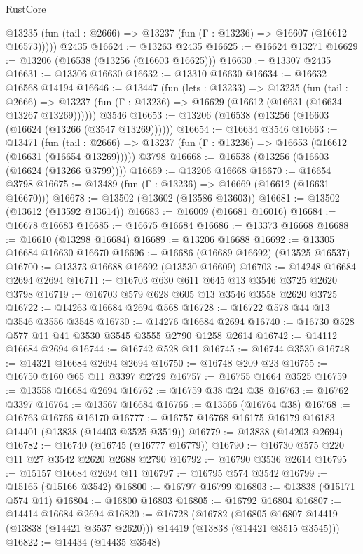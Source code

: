 \begin{lexlean}{RustCore}
\begin{coremodule}
      @13235 (fun (tail : @2666) => @13237 (fun (Γ : @13236) => @16607 (@16612 @16573)))))
    @2435
@16624 := @13263 @2435
@16625 := @16624 @13271
@16629 := @13206 (@16538 (@13256 (@16603 @16625)))
@16630 := @13307 @2435
@16631 := @13306 @16630
@16632 := @13310 @16630
@16634 := @16632 @16568 @14194
@16646 := @13447
    (fun (lets : @13233) =>
    @13235
      (fun (tail : @2666) =>
      @13237 (fun (Γ : @13236) => @16629 (@16612 (@16631 (@16634 @13267 @13269))))))
    @3546
@16653 := @13206 (@16538 (@13256 (@16603 (@16624 (@13266 (@3547 @13269))))))
@16654 := @16634 @3546
@16663 := @13471
    (fun (tail : @2666) => @13237 (fun (Γ : @13236) => @16653 (@16612 (@16631 (@16654 @13269)))))
    @3798
@16668 := @16538 (@13256 (@16603 (@16624 (@13266 @3799))))
@16669 := @13206 @16668
@16670 := @16654 @3798
@16675 := @13489 (fun (Γ : @13236) => @16669 (@16612 (@16631 @16670)))
@16678 := @13502 (@13602 (@13586 @13603))
@16681 := @13502 (@13612 (@13592 @13614))
@16683 := @16009 (@16681 @16016)
@16684 := @16678 @16683
@16685 := @16675 @16684
@16686 := @13373 @16668
@16688 := @16610 (@13298 @16684)
@16689 := @13206 @16688
@16692 := @13305 @16684 @16630 @16670
@16696 := @16686 (@16689 @16692) (@13525 @16537)
@16700 := @13373 @16688 @16692 (@13530 @16609)
@16703 := @14248 @16684 @2694 @2694
@16711 := @16703 @630 @611 @645 @13 @3546 @3725 @2620 @3798
@16719 := @16703 @579 @628 @605 @13 @3546 @3558 @2620 @3725
@16722 := @14263 @16684 @2694 @568
@16728 := @16722 @578 @44 @13 @3546 @3556 @3548
@16730 := @14276 @16684 @2694
@16740 := @16730 @528 @577 @11 @41 @3530 @3545 @3555 @2790 @1258 @2614
@16742 := @14112 @16684 @2694
@16744 := @16742 @528 @11
@16745 := @16744 @3530
@16748 := @14321 @16684 @2694 @2694
@16750 := @16748 @209 @23
@16755 := @16750 @160 @65 @11 @3397 @2729
@16757 := @16755 @1664 @3525
@16759 := @13558 @16684 @2694
@16762 := @16759 @38 @24 @38
@16763 := @16762 @3397
@16764 := @13567 @16684
@16766 := @13566 (@16764 @38)
@16768 := @16763 @16766 @16170
@16777 := @16757 @16768 @16175 @16179 @16183 @14401 (@13838 (@14403 @3525 @3519))
@16779 := @13838 (@14203 @2694)
@16782 := @16740 (@16745 (@16777 @16779))
@16790 := @16730 @575 @220 @11 @27 @3542 @2620 @2688 @2790
@16792 := @16790 @3536 @2614
@16795 := @15157 @16684 @2694 @11
@16797 := @16795 @574 @3542
@16799 := @15165 (@15166 @3542)
@16800 := @16797 @16799
@16803 := @13838 (@15171 @574 @11)
@16804 := @16800 @16803
@16805 := @16792 @16804
@16807 := @14414 @16684 @2694
@16820 := @16728
    (@16782
      (@16805 @16807 @14419 (@13838 (@14421 @3537 @2620)))
      @14419
      (@13838 (@14421 @3515 @3545)))
@16822 := @14434 (@14435 @3548)

\end{coremodule}
\end{lexlean}
